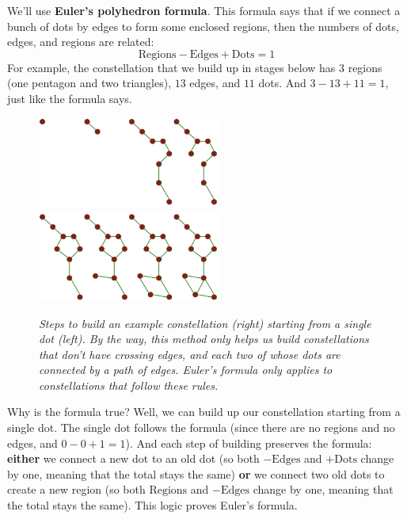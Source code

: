 \documentclass{article}
\begin{document}
            We'll use \textbf{Euler's polyhedron formula}.  This formula says
            that if we connect a bunch of dots by edges to form some enclosed
            regions, then the numbers of dots, edges, and regions are related:
            $$
                \text{Regions} - \text{Edges} + \text{Dots} = 1
            $$
            For example, the constellation that we build up in stages below
            has $3$ regions (one pentagon and two triangles), $13$ edges, and
            $11$ dots.  And $3-13+11 = 1$, just like the formula says.
            \begin{figure}[h!]
                \centering
                \includegraphics[height=3cm]{euler-a}
                \includegraphics[height=3cm]{euler-b}
                \caption{\emph{
                    Steps to build an example constellation (right) starting
                    from a single dot (left).
                    By the way, this method only helps us build constellations
                    that don't have crossing edges, and each two of whose dots
                    are connected by a path of edges.  Euler's formula only
                    applies to constellations that follow these rules.
                }}
            \end{figure}
            Why is the formula true?  Well, we can build up our constellation
            starting from a single dot.  The single dot follows the formula
            (since there are no regions and no edges, and $0-0+1 = 1$).  And
            each step of building preserves the formula:
            \textbf{either} we connect a new dot to an old dot (so both
            $-\text{Edges}$ and $+\text{Dots}$ change by one, meaning that the
            total stays the same)
            \textbf{or} we connect two old dots to create a new region (so both
            $\text{Regions}$ and $-\text{Edges}$ change by one, meaning that
            the total stays the same).  This logic proves Euler's formula. 
\end{document}
